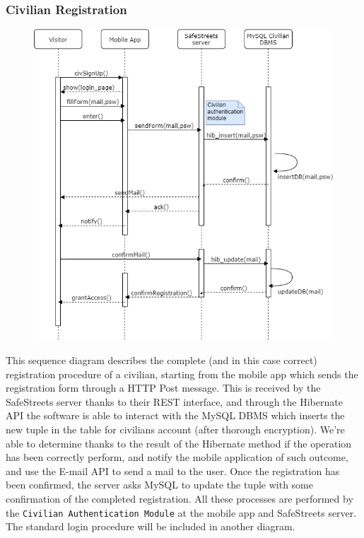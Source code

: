\documentclass[12pt,a4paper]{article}
\begin{document}
\subsubsection{Civilian Registration}
\begin{figure}[H]
\begin{adjustwidth}{-25mm}{-25mm}
				\centering				
					        \includegraphics[width=0.5\paperwidth]{Images/Registration_sequence}
\end{adjustwidth}
\end{figure}
This sequence diagram describes the complete (and in this case correct) registration procedure of a civilian, starting from the mobile app which sends the registration form through a HTTP Post message. This is received by the SafeStreets server thanks to their REST interface, and through the Hibernate API the software is able to interact with the MySQL DBMS which inserts the new tuple in the table for civilians account (after thorough encryption). We're able to determine thanks to the result of the Hibernate method if the operation has been correctly perform, and notify the mobile application of such outcome, and use the E-mail API to send a mail to the user. Once the registration has been confirmed, the server asks MySQL to update the tuple with some confirmation of the completed registration. All these processes are performed by the \texttt{Civilian Authentication Module} at the mobile app and SafeStreets server. The standard login procedure will be included in another diagram.
\end{document}
